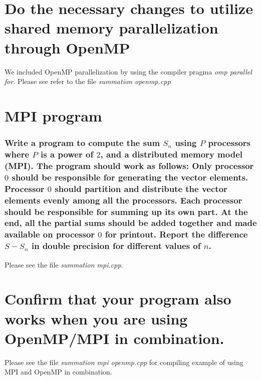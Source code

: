 \documentclass[a4paper]{article} %
\begin{document}
\section{Do the necessary changes to utilize shared memory parallelization through OpenMP}
We included OpenMP parallelization by using the compiler pragma \emph{omp parallel for}. Please see refer to the file \emph{summation openmp.cpp}

\section{MPI program}
\subsubsection*{Write a program to compute the sum $S_n$ using $P$ processors where $P$ is a power of $2$, and a distributed memory model (MPI). The program should work as follows: Only processor $0$ should be responsible for generating the vector elements. Processor $0$ should partition and distribute the vector elements evenly among all the processors. Each processor should be responsible for summing up its own part. At the end, all the partial sums should be added together and made available on processor $0$ for printout. Report the difference $S - S_n$ in double precision for different values of $n$.}
Please see the file \emph{summation mpi.cpp}.\\
   
\section{Confirm that your program also works when you are using OpenMP/MPI in combination.}
Please see the file \emph{summation mpi openmp.cpp} for compiling example of using MPI and OpenMP in combination.
\end{document}
